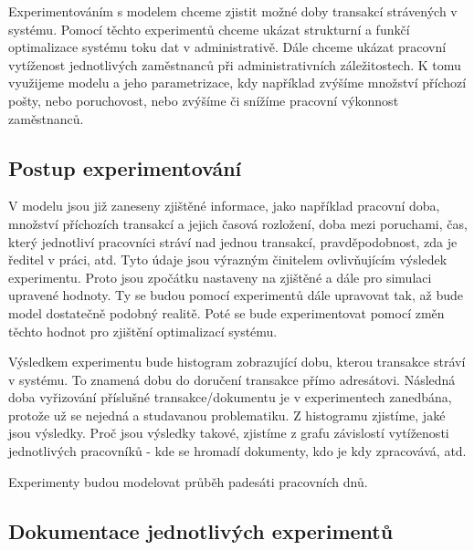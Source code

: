 \documentclass[12pt,a4paper]{article}
\begin{document}
Experimentováním s modelem chceme zjistit možné doby transakcí strávených v sys\-té\-mu. Pomocí těchto experimentů chceme ukázat strukturní a funkčí optimalizace systému toku dat v administrativě. Dále chceme ukázat pracovní vytíženost jednotlivých za\-měst\-nan\-ců při administrativních záležitostech. K tomu využijeme modelu a jeho pa\-ra\-met\-ri\-za\-ce, kdy například zvýšíme množství příchozí pošty, nebo poruchovost, nebo zvýšíme či snížíme pracovní výkonnost zaměstnanců.

\subsection{Postup experimentování}
V modelu jsou již zaneseny zjištěné informace, jako například pracovní doba, množství příchozích transakcí a jejich časová rozložení, doba mezi poruchami, čas, který jednotliví pracovníci stráví nad jednou transakcí, pravděpodobnost, zda je ředitel v práci, atd. Tyto údaje jsou výrazným činitelem ovlivňujícím výsledek experimentu. Proto jsou zpočátku nastaveny na zjištěné a dále pro simulaci upravené hodnoty. Ty se budou pomocí experimentů dále upravovat tak, až bude model dostatečně podobný realitě. Poté se bude experimentovat pomocí změn těchto hodnot pro zjištění optimalizací systému.

Výsledkem experimentu bude histogram zobrazující dobu, kterou transakce stráví v systému. To znamená dobu do doručení transakce přímo adresátovi. Následná doba vyřizování příslušné transakce/dokumentu je v experimentech zanedbána, protože už se nejedná a studavanou problematiku. Z histogramu zjistíme, jaké jsou výsledky. Proč jsou výsledky takové, zjistíme z grafu závislostí vytíženosti jednotlivých pracovníků - kde se hromadí dokumenty, kdo je kdy zpracovává, atd. 

%
%
%
%

Experimenty budou modelovat průběh padesáti pracovních dnů.

\subsection{Dokumentace jednotlivých experimentů}
\end{document}
